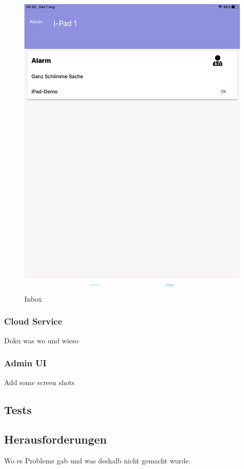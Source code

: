 \begin{figure}[h]
\begin{minipage}[b]{0.4\textwidth}
        \includegraphics[width=\textwidth]{graphics/screenshots/mobileclient/screenshots-inbox}
        \caption{Inbox}
    \end{minipage}
    \label{fig:MobileClient-Screens2}
\end{figure}

\clearpage

\subsubsection{Cloud Service}

Doku was wo und wieso

\subsubsection{Admin UI}

Add some screen shots

\subsection{Tests}

\subsection{Herausforderungen}

Wo es Probleme gab und was deshalb nicht gemacht wurde.







